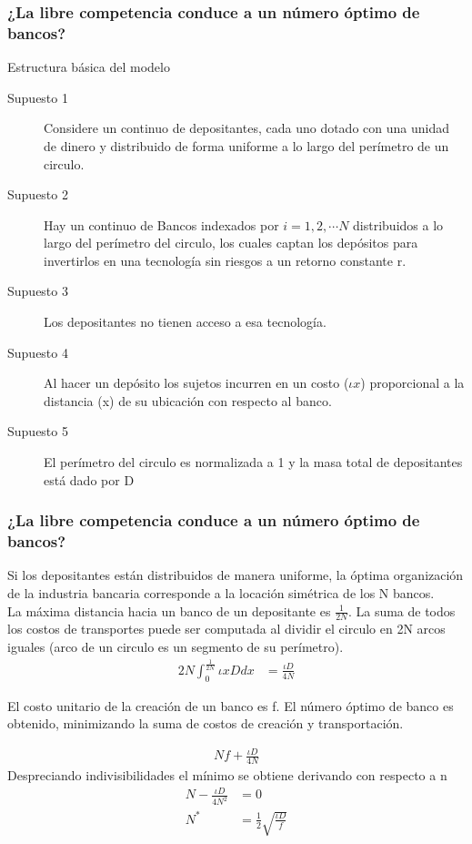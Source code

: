 \documentclass[10pt, xcolor=table, x11names]{beamer}
\begin{document}
\begin{frame}
    \frametitle{{\normalsize ¿La libre competencia conduce a un número óptimo de bancos?} {}}
    
   \begin{block} {Estructura básica del modelo}
       \begin{description}
           \item[Supuesto 1]  Considere un continuo de depositantes, cada uno dotado con una unidad de dinero y distribuido de forma uniforme a lo largo del perímetro de un  circulo.
           \item[Supuesto 2] Hay un continuo de Bancos indexados por $i=1,2,\cdots N$ distribuidos a lo largo del perímetro del circulo, los cuales captan los depósitos para invertirlos en una tecnología sin riesgos a un retorno constante r.
           \item[Supuesto 3] Los depositantes no tienen acceso a esa tecnología.
            \item[Supuesto 4] Al hacer un depósito los sujetos incurren en un costo ($\iota x$) proporcional a la distancia (x) de su ubicación con respecto al banco. 
             \item[Supuesto 5] El perímetro  del circulo es normalizada a 1 y la masa total de depositantes está dado por D
       \end{description}
       
   \end{block}	
    
\end{frame}


\begin{frame}
    \frametitle{{\normalsize ¿La libre competencia conduce a un número óptimo de bancos?} {}}
 Si los depositantes están distribuidos de manera uniforme, la óptima organización de la industria bancaria corresponde a la locación simétrica de los N bancos.\\
 La máxima distancia hacia un banco de un depositante es  $\frac{1}{2N}$. La suma de todos los costos de transportes puede ser computada al dividir el circulo en 2N arcos iguales (arco de un circulo es un segmento de su perímetro).  
   \begin{align}
  2N\int_{0}^{\frac{1}{2N}}\iota xDdx&=\frac{\iota D}{4N}
  \end{align}  
    
  El costo unitario de la creación de un banco es f. El número óptimo de banco es obtenido, minimizando la suma de costos de creación y transportación.
  
   \begin{align}
  Nf+\frac{\iota D}{4N}
  \end{align}  
  Despreciando indivisibilidades el mínimo se obtiene derivando con respecto a n
  \begin{align}
  N-\frac{\iota D}{4N^{2}}&=0 \nonumber\\
  N^{*}&=\frac{1}{2}\sqrt{\frac{\iota D}{f}}
  \end{align}  
\end{frame}
\end{document}
